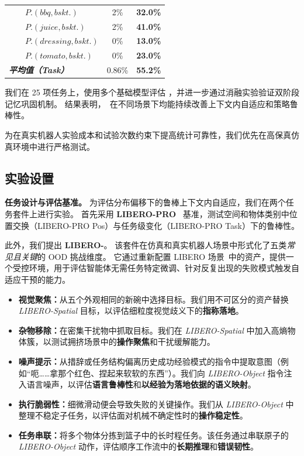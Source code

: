\begin{table}[t]
{\begin{tabular}{l|clcc}
    & & $P.(bbq, bskt.)$            & 2\% & \textbf{32.0\%} \\
    & & $P.(juice, bskt.)$          & 2\% & \textbf{41.0\%} \\
    & & $P.(dressing, bskt.)$       & 0\% & \textbf{13.0\%} \\
    & & $P.(tomato, bskt.)$         & 0\% & \textbf{23.0\%} \\
    \midrule
    \multicolumn{3}{l|}{\rule{0pt}{2.5ex} \textit{\textbf{平均值（Task）}}} & 0.86\% & \textbf{55.2\%} \\
    \bottomrule
  \end{tabular}
  }
  \vspace{-1.5em}
\end{table}

我们在 25 项任务上，使用多个基础模型评估 \sys，并进一步通过消融实验验证双阶段记忆巩固机制。
结果表明，\sys\ 在不同场景下均能持续改善上下文内自适应和策略鲁棒性。

为在真实机器人实验成本和试验次数约束下提高统计可靠性，我们优先在高保真仿真环境中进行严格测试。

\subsection{实验设置}

\noindent\textbf{任务设计与评估基准。}
为评估分布偏移下的鲁棒上下文内自适应，我们在两个任务套件上进行实验。
首先采用 \textbf{LIBERO-PRO}~\cite{liberopro} 基准，测试空间和物体类别中位置交换（LIBERO-PRO Pos）与任务级变化（LIBERO-PRO Task）下的鲁棒性。

此外，我们提出 \textbf{LIBERO-\sys}。
该套件在仿真和真实机器人场景中形式化了五类\textit{常见且关键}的 OOD 挑战维度。
它通过重新配置 LIBERO 场景~\cite{libero_ref}中的资产，提供一个受控环境，用于评估智能体无需任务特定微调、针对反复出现的失败模式触发自适应干预的能力。

\begin{itemize}
    \item \textbf{视觉聚焦：}从五个外观相同的新碗中选择目标。我们用不可区分的资产替换 \textit{LIBERO-Spatial} 目标，以评估细粒度视觉歧义下的\textbf{指称落地}。

    \item \textbf{杂物移除：}在密集干扰物中抓取目标。我们在 \textit{LIBERO-Spatial} 中加入高熵物体簇，以测试拥挤场景中的\textbf{操作聚焦}和干扰缓解能力。

    \item \textbf{噪声提示：}从措辞或任务结构偏离历史成功经验模式的指令中提取意图（例如“呃……拿那个红色、捏起来软软的东西”）。我们向 \textit{LIBERO-Object} 指令注入语言噪声，以评估\textbf{语言鲁棒性}和\textbf{以经验为落地依据的语义映射}。

    \item \textbf{执行脆弱性：}细微滑动便会导致失败的关键操作。我们从 \textit{LIBERO-Object} 中整理不稳定子任务，以评估面对机械不确定性时的\textbf{操作稳定性}。

    \item \textbf{任务串联：}将多个物体分拣到篮子中的长时程任务。该任务通过串联原子的 \textit{LIBERO-Object} 动作，评估顺序工作流中的\textbf{长期推理}和\textbf{错误韧性}。
\end{itemize}

